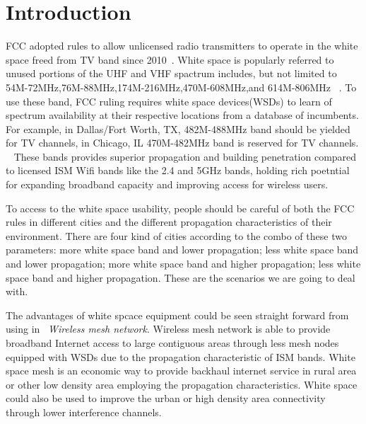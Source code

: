 \section{Introduction}
\label{sec:introduction}

FCC adopted rules to allow unlicensed radio transmitters to operate in the white space freed from TV band since 2010~\cite{fccwhitespace}. White space is popularly referred to unused portions of the UHF and VHF spactrum includes, but not limited to 54M-72MHz,76M-88MHz,174M-216MHz,470M-608MHz,and 614M-806MHz ~\cite{whitespacewiki}.
To use these band, FCC ruling requires white space devices(WSDs) to learn of spectrum availability at their respective locations from a database of incumbents. For example, in Dallas/Fort Worth, TX, 482M-488MHz band should be yielded for TV channels, in Chicago, IL 470M-482MHz band is reserved for TV channels. ~\cite{broadband}
 These bands provides superior propagation and building penetration compared to licensed ISM Wifi bands like the 2.4 and 5GHz bands, holding rich poetntial for expanding broadband capacity and improving access for wireless users.

To access to the white space usability, people should be careful of both the FCC rules in different cities and the different propagation characteristics of their environment.
There are four kind of cities according to the combo of these two parameters: 
more white space band and lower propagation; less white space band and lower propagation; more white space band and higher propagation; less white space band and higher propagation.
These are the scenarios we are going to deal with.

The advantages of white spcace equipment could be seen straight forward from using in ~\emph{Wireless mesh network}.
Wireless mesh network is able to provide broadband Internet access to large contiguous areas through less mesh nodes equipped with WSDs due to the propagation characteristic of ISM bands. White space mesh is an economic way to provide backhaul internet service in rural area or other low density area employing the propagation characteristics.
White space could also be used to improve the urban or high density area connectivity through lower interference channels. 

